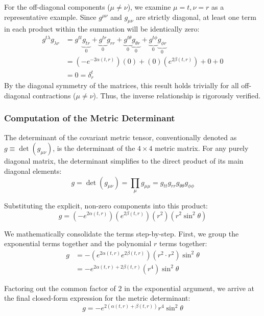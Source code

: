 \documentclass[11pt, a4paper]{report}
\begin{document}
For the off-diagonal components ($\mu \neq \nu$), we examine $\mu = t, \nu = r$ as a representative example. Since $g^{\mu\nu}$ and $g_{\mu\nu}$ are strictly diagonal, at least one term in each product within the summation will be identically zero:
\begin{align}
    g^{t\lambda} g_{\lambda r} &= g^{tt} \underbrace{g_{tr}}_{0} + \underbrace{g^{tr}}_{0} g_{rr} + \underbrace{g^{t\theta}}_{0} \underbrace{g_{\theta r}}_{0} + \underbrace{g^{t\phi}}_{0} \underbrace{g_{\phi r}}_{0} \nonumber \\
    &= \left( -e^{-2\alpha(t,r)} \right) (0) + (0) \left( e^{2\beta(t,r)} \right) + 0 + 0 \nonumber \\
    &= 0 = \delta^t_r
\end{align}
By the diagonal symmetry of the matrices, this result holds trivially for all off-diagonal contractions ($\mu \neq \nu$). Thus, the inverse relationship is rigorously verified.

\subsubsection*{Computation of the Metric Determinant}
The determinant of the covariant metric tensor, conventionally denoted as $g \equiv \det(g_{\mu\nu})$, is the determinant of the $4 \times 4$ metric matrix. For any purely diagonal matrix, the determinant simplifies to the direct product of its main diagonal elements:
\begin{equation}
    g = \det(g_{\mu\nu}) = \prod_{\mu} g_{\mu\mu} = g_{tt} g_{rr} g_{\theta\theta} g_{\phi\phi}
\end{equation}

Substituting the explicit, non-zero components into this product:
\begin{equation}
    g = \left( -e^{2\alpha(t,r)} \right) \left( e^{2\beta(t,r)} \right) \left( r^2 \right) \left( r^2 \sin^2\theta \right)
\end{equation}

We mathematically consolidate the terms step-by-step. First, we group the exponential terms together and the polynomial $r$ terms together:
\begin{align}
    g &= - \left( e^{2\alpha(t,r)} e^{2\beta(t,r)} \right) \left( r^2 \cdot r^2 \right) \sin^2\theta \nonumber \\
    &= - e^{2\alpha(t,r) + 2\beta(t,r)} \left( r^4 \right) \sin^2\theta
\end{align}

Factoring out the common factor of $2$ in the exponential argument, we arrive at the final closed-form expression for the metric determinant:
\begin{equation}
    g = -e^{2(\alpha(t,r) + \beta(t,r))} r^4 \sin^2\theta
\end{equation}
\end{document}
